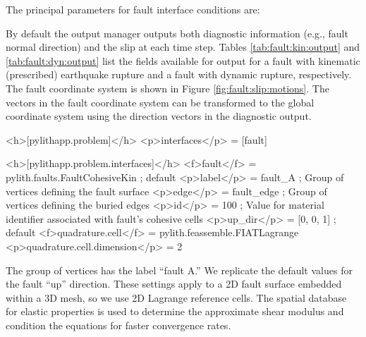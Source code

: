 The principal parameters for fault interface conditions are:
\begin{inventory}
\end{inventory}
By default the output manager outputs both diagnostic information
(e.g., fault normal direction) and the slip at each time step. Tables
\vref{tab:fault:kin:output} and \vref{tab:fault:dyn:output} list the
fields available for output for a fault with kinematic (prescribed)
earthquake rupture and a fault with dynamic rupture, respectively.
The fault coordinate system is shown in Figure \vref{fig:fault:slip:motions}.
The vectors in the fault coordinate system can be transformed to the
global coordinate system using the direction vectors in the diagnostic
output.

\begin{cfg}
<h>[pylithapp.problem]</h>
<p>interfaces</p> = [fault] 

<h>[pylithapp.problem.interfaces]</h>
<f>fault</f> = pylith.faults.FaultCohesiveKin ; default
<p>label</p> = fault_A ; Group of vertices defining the fault surface
<p>edge</p> = fault_edge ; Group of vertices defining the buried edges
<p>id</p> = 100 ; Value for material identifier associated with fault's cohesive cells
<p>up_dir</p> = [0, 0, 1] ; default
<f>quadrature.cell</f> = pylith.feassemble.FIATLagrange
<p>quadrature.cell.dimension</p> = 2
\end{cfg}
The group of vertices has the label ``fault A.'' We replicate the
default values for the fault ``up'' direction. These settings apply
to a 2D fault surface embedded within a 3D mesh, so we use 2D Lagrange
reference cells. The spatial database for elastic properties is used
to determine the approximate shear modulus and condition the equations
for faster convergence rates.


